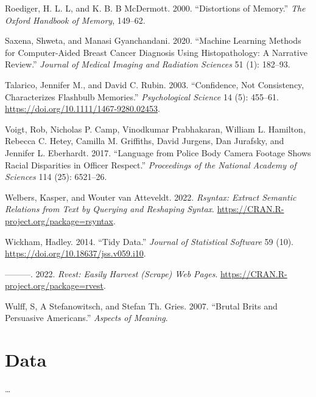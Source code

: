 \documentclass[
  letterpaper,
]{scrbook}
\newlength{\cslhangindent}
\newlength{\cslentryspacingunit} %
\newenvironment{CSLReferences}[2] %
 {%
  \setlength{\parindent}{0pt}
  \ifodd #1
  \let\oldpar\par
  \def\par{\hangindent=\cslhangindent\oldpar}
  \fi
  \setlength{\parskip}{#2\cslentryspacingunit}
 }%
 {}
\begin{document}
\begin{CSLReferences}{1}{0}
\leavevmode{}%
Roediger, H. L. L, and K. B. B McDermott. 2000. {``Distortions of
Memory.''} \emph{The Oxford Handbook of Memory}, 149--62.

\leavevmode{}%
Saxena, Shweta, and Manasi Gyanchandani. 2020. {``Machine Learning
Methods for Computer-Aided Breast Cancer Diagnosis Using Histopathology:
A Narrative Review.''} \emph{Journal of Medical Imaging and Radiation
Sciences} 51 (1): 182--93.

\leavevmode{}%
Talarico, Jennifer M., and David C. Rubin. 2003. {``Confidence, Not
Consistency, Characterizes Flashbulb Memories.''} \emph{Psychological
Science} 14 (5): 455--61. \url{https://doi.org/10.1111/1467-9280.02453}.

\leavevmode{}%
Voigt, Rob, Nicholas P. Camp, Vinodkumar Prabhakaran, William L.
Hamilton, Rebecca C. Hetey, Camilla M. Griffiths, David Jurgens, Dan
Jurafsky, and Jennifer L. Eberhardt. 2017. {``Language from Police Body
Camera Footage Shows Racial Disparities in Officer Respect.''}
\emph{Proceedings of the National Academy of Sciences} 114 (25):
6521--26.

\leavevmode{}%
Welbers, Kasper, and Wouter van Atteveldt. 2022. \emph{Rsyntax: Extract
Semantic Relations from Text by Querying and Reshaping Syntax}.
\url{https://CRAN.R-project.org/package=rsyntax}.

\leavevmode{}%
Wickham, Hadley. 2014. {``Tidy Data.''} \emph{Journal of Statistical
Software} 59 (10). \url{https://doi.org/10.18637/jss.v059.i10}.

\leavevmode{}%
---------. 2022. \emph{Rvest: Easily Harvest (Scrape) Web Pages}.
\url{https://CRAN.R-project.org/package=rvest}.

\leavevmode{}%
Wulff, S, A Stefanowitsch, and Stefan Th. Gries. 2007. {``Brutal Brits
and Persuasive Americans.''} \emph{Aspects of Meaning}.

\end{CSLReferences}

\appendix
{}

\hypertarget{data-appendix}{%
\chapter{Data}\label{data-appendix}}

\ldots{}


\backmatter

\printindex
\end{document}
